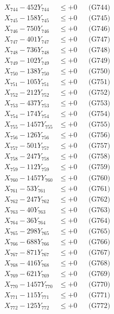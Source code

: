 \documentclass[a4paper,10pt]{article}
\begin{document}
{\begin{align}
X_{744} - 452Y_{744} &\leq +0 && \text{(G744)} \\
X_{745} - 158Y_{745} &\leq +0 && \text{(G745)} \\
X_{746} - 750Y_{746} &\leq +0 && \text{(G746)} \\
X_{747} - 401Y_{747} &\leq +0 && \text{(G747)} \\
X_{748} - 736Y_{748} &\leq +0 && \text{(G748)} \\
X_{749} - 102Y_{749} &\leq +0 && \text{(G749)} \\
X_{750} - 138Y_{750} &\leq +0 && \text{(G750)} \\
\allowbreak
X_{751} - 105Y_{751} &\leq +0 && \text{(G751)} \\
X_{752} - 212Y_{752} &\leq +0 && \text{(G752)} \\
X_{753} - 437Y_{753} &\leq +0 && \text{(G753)} \\
X_{754} - 174Y_{754} &\leq +0 && \text{(G754)} \\
X_{755} - 1457Y_{755} &\leq +0 && \text{(G755)} \\
X_{756} - 126Y_{756} &\leq +0 && \text{(G756)} \\
X_{757} - 501Y_{757} &\leq +0 && \text{(G757)} \\
X_{758} - 247Y_{758} &\leq +0 && \text{(G758)} \\
X_{759} - 112Y_{759} &\leq +0 && \text{(G759)} \\
X_{760} - 1457Y_{760} &\leq +0 && \text{(G760)} \\
\allowbreak
X_{761} - 53Y_{761} &\leq +0 && \text{(G761)} \\
X_{762} - 247Y_{762} &\leq +0 && \text{(G762)} \\
X_{763} - 40Y_{763} &\leq +0 && \text{(G763)} \\
X_{764} - 36Y_{764} &\leq +0 && \text{(G764)} \\
X_{765} - 298Y_{765} &\leq +0 && \text{(G765)} \\
X_{766} - 688Y_{766} &\leq +0 && \text{(G766)} \\
X_{767} - 871Y_{767} &\leq +0 && \text{(G767)} \\
X_{768} - 416Y_{768} &\leq +0 && \text{(G768)} \\
X_{769} - 621Y_{769} &\leq +0 && \text{(G769)} \\
X_{770} - 1457Y_{770} &\leq +0 && \text{(G770)} \\
\allowbreak
X_{771} - 115Y_{771} &\leq +0 && \text{(G771)} \\
X_{772} - 125Y_{772} &\leq +0 && \text{(G772)} \\

\end{align}}
\end{document}
